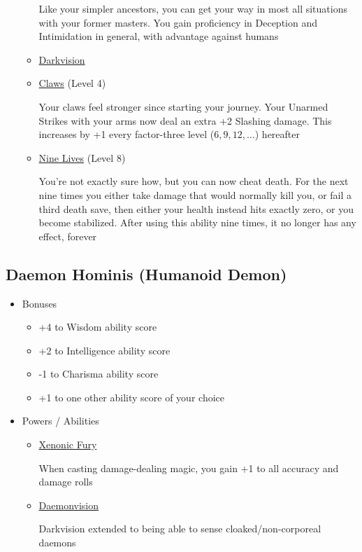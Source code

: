 \documentclass[12pt, landscape]{article}
\begin{document}
\begin{FlushLeft}
\begin{multicols}{2}
\begin{itemize}
\begin{itemize}
					Like your simpler ancestors, you can get your way in most all situations with your former masters.
					You gain proficiency in Deception and Intimidation in general, with advantage against humans
					\item \underline{Darkvision}
					\item \underline{Claws} (Level 4)

					Your claws feel stronger since starting your journey.
					Your Unarmed Strikes with your arms now deal an extra +2 Slashing damage. This increases by +1 every factor-three level ($6, 9, 12, \dots$) hereafter

					\item \underline{Nine Lives} (Level 8)

					You’re not exactly sure how, but you can now cheat death.
					For the next nine times you either take damage that would normally kill you, or fail a third death save, then either your health instead hits exactly zero, or you become stabilized.
					After using this ability nine times, it no longer has any effect, forever
				\end{itemize}
			\end{itemize}
			\vfill \pagebreak

			\subsection{Daemon Hominis (Humanoid Demon)}
			\begin{itemize}
				\item Bonuses
				\begin{itemize}
					\item +4 to Wisdom ability score
					\item +2 to Intelligence ability score
					\item -1 to Charisma ability score
					\item +1 to one other ability score of your choice
				\end{itemize}
				\item Powers / Abilities
				\begin{itemize}
					\item \underline{Xenonic Fury}

					When casting damage-dealing magic, you gain +1 to all accuracy and damage rolls

					\item \underline{Daemonvision}

					Darkvision extended to being able to sense cloaked/non-corporeal daemons


\end{itemize}
\end{itemize}
\end{multicols}
\end{FlushLeft}
\end{document}
